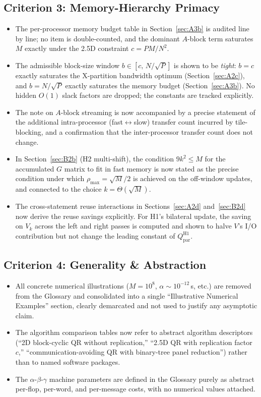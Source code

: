 \documentclass[11pt]{article}
\begin{document}
\subsection*{Criterion 3: Memory-Hierarchy Primacy}

\begin{itemize}[leftmargin=2em]
\item The per-processor memory budget table in Section~\ref{sec:A3b}
  is audited line by line; no item is double-counted, and the dominant
  $A$-block term saturates $M$ exactly under the 2.5D constraint
  $c = PM/N^2$.
\item The admissible block-size window $b \in [c,\,N/\sqrt{P}]$ is
  shown to be \emph{tight}: $b = c$ exactly saturates the X-partition
  bandwidth optimum (Section~\ref{sec:A2c}), and $b = N/\sqrt{P}$
  exactly saturates the memory budget (Section~\ref{sec:A3b}). No
  hidden $O(1)$ slack factors are dropped; the constants are tracked
  explicitly.
\item The note on $A$-block streaming is now accompanied by a precise
  statement of the additional intra-processor (fast$\leftrightarrow$slow)
  transfer count incurred by tile-blocking, and a confirmation that the
  inter-processor transfer count does not change.
\item In Section~\ref{sec:B2b} (H2 multi-shift), the condition
  $9k^2 \le M$ for the accumulated $G$ matrix to fit in fast memory is
  now stated as the precise condition under which $\rho_{\max} = \sqrt{M}/2$
  is achieved on the off-window updates, and connected to the choice
  $k = \Theta(\sqrt{M})$.
\item The cross-statement reuse interactions in Sections~\ref{sec:A2d}
  and~\ref{sec:B2d} now derive the reuse savings explicitly. For H1's
  bilateral update, the saving on $V_k$ across the left and right passes
  is computed and shown to halve $V$'s I/O contribution but not change
  the leading constant of $Q^{\mathrm{H1}}_{\mathrm{par}}$.
\end{itemize}

\subsection*{Criterion 4: Generality \& Abstraction}

\begin{itemize}[leftmargin=2em]
\item All concrete numerical illustrations ($M = 10^8$, $\alpha\sim10^{-12}$\,s,
  etc.) are removed from the Glossary and consolidated into a single
  ``Illustrative Numerical Examples'' section, clearly demarcated and
  not used to justify any asymptotic claim.
\item The algorithm comparison tables now refer to abstract algorithm
  descriptors (``2D block-cyclic QR without replication,'' ``2.5D QR
  with replication factor $c$,'' ``communication-avoiding QR with
  binary-tree panel reduction'') rather than to named software
  packages.
\item The $\alpha$-$\beta$-$\gamma$ machine parameters are defined in
  the Glossary purely as abstract per-flop, per-word, and per-message
  costs, with no numerical values attached.
\end{itemize}
\end{document}
